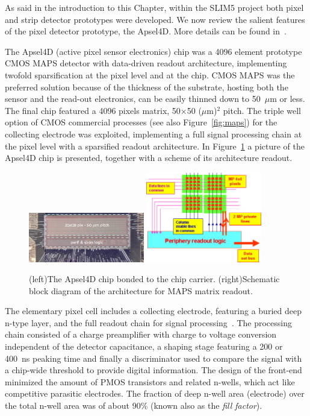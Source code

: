 As said in the introduction to this Chapter, within the SLIM5 project both pixel and strip detector
prototypes were developed. We now review the salient features of the pixel 
detector prototype, the Apsel4D. More details can be found in~\cite{BETTARINI2010942,NERI2010195}.

The Apsel4D (active pixel sensor electronics) chip was a 4096 element prototype CMOS MAPS 
detector with 
data-driven readout architecture, implementing twofold sparsification at the pixel level and at the chip. 
CMOS MAPS was the preferred solution because of the thickness of the substrate, hosting both the 
sensor and the read-out electronics, can be easily thinned down to 50~$\mu$m or less. 
The final chip featured a 4096 pixels matrix, 50$\times$50 ($\mu$m)$^2$ pitch. 
  The triple well option of CMOS commercial processes (see also Figure~\ref{fig:maps}) for the collecting electrode was exploited, implementing a full signal processing chain at the pixel level with a sparsified readout architecture. 
In Figure~\ref{fig:apsel} a picture of the Apsel4D chip is presented, together with a scheme of its architecture readout.

\begin{figure}[!htpb]
\centering
\includegraphics[width=0.45\textwidth]{Apsel.jpg}
\includegraphics[width=0.45\textwidth]{Apselro.jpg}
\caption{\label{fig:apsel}(left)The Apsel4D chip bonded to the chip carrier. (right)Schematic block diagram of the architecture for MAPS matrix readout.}
\end{figure}

The elementary pixel cell includes a collecting electrode, featuring a buried deep n-type layer, and the full readout chain for signal processing~\cite{Ratti:2006zz}. The processing chain consisted of a charge 
preamplifier with charge to voltage conversion independent of the detector capacitance, a shaping 
stage featuring a 200 or 400~ns peaking time and finally a discriminator used to compare the signal with a chip-wide threshold to provide digital information. 
The design of the front-end minimized the amount of PMOS transistors and related n-wells, which act 
like competitive parasitic electrodes. The fraction of deep n-well area (electrode) over the total n-well 
area was of about 90\% (known also as the {\it fill factor}). 



